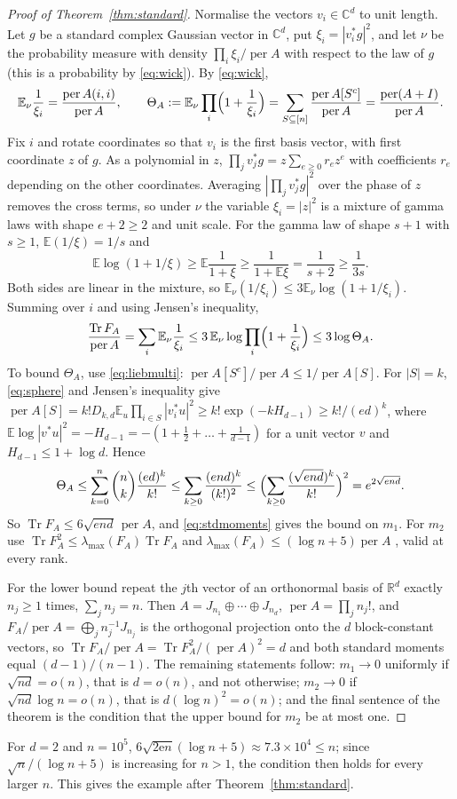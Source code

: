 \documentclass[11pt,a4paper]{article}
\theoremstyle{remark}
\newcommand{\per}{\operatorname{per}}
\newcommand{\Tr}{\operatorname{Tr}}
\newcommand{\R}{\mathbb R}
\newcommand{\C}{\mathbb C}
\newcommand{\E}{\mathbb E}
\begin{document}
\begin{proof}[Proof of Theorem~\ref{thm:standard}]
Normalise the vectors $v_i\in\C^d$ to unit length. Let $g$ be a standard complex Gaussian vector in $\C^d$, put $\xi_i=|v_i^*g|^2$, and let $\nu$ be the probability measure with density $\prod_i\xi_i/\per A$ with respect to the law of $g$ (this is a probability by \eqref{eq:wick}). By \eqref{eq:wick},
\[
 \E_\nu\frac1{\xi_i}=\frac{\per A(i,i)}{\per A},\qquad
 \Theta_A:=\E_\nu\prod_i\Bigl(1+\frac1{\xi_i}\Bigr)=\sum_{S\subseteq[n]}\frac{\per A[S^c]}{\per A}=\frac{\per(A+I)}{\per A}.
\]
Fix $i$ and rotate coordinates so that $v_i$ is the first basis vector, with first coordinate $z$ of $g$. As a polynomial in $z$, $\prod_jv_j^*g=z\sum_{e\ge0}r_ez^e$ with coefficients $r_e$ depending on the other coordinates. Averaging $|\prod_jv_j^*g|^2$ over the phase of $z$ removes the cross terms, so under $\nu$ the variable $\xi_i=|z|^2$ is a mixture of gamma laws with shape $e+2\ge2$ and unit scale. For the gamma law of shape $s+1$ with $s\ge1$, $\E(1/\xi)=1/s$ and
\[
 \E\log(1+1/\xi)\ge\E\frac1{1+\xi}\ge\frac1{1+\E\xi}=\frac1{s+2}\ge\frac1{3s}.
\]
Both sides are linear in the mixture, so $\E_\nu(1/\xi_i)\le3\E_\nu\log(1+1/\xi_i)$. Summing over $i$ and using Jensen's inequality,
\[
 \frac{\Tr F_A}{\per A}=\sum_i\E_\nu\frac1{\xi_i}\le3\,\E_\nu\log\prod_i\Bigl(1+\frac1{\xi_i}\Bigr)\le3\log\Theta_A .
\]
To bound $\Theta_A$, use \eqref{eq:liebmulti}: $\per A[S^c]/\per A\le1/\per A[S]$. For $|S|=k$, \eqref{eq:sphere} and Jensen's inequality give $\per A[S]=k!D_{k,d}\E_u\prod_{i\in S}|v_i^*u|^2\ge k!\exp(-kH_{d-1})\ge k!/(ed)^k$, where $\E\log|v^*u|^2=-H_{d-1}=-(1+\frac12+\dots+\frac1{d-1})$ for a unit vector $v$ and $H_{d-1}\le1+\log d$. Hence
\[
 \Theta_A\le\sum_{k=0}^n\binom nk\frac{(ed)^k}{k!}\le\sum_{k\ge0}\frac{(end)^k}{(k!)^2}\le\Bigl(\sum_{k\ge0}\frac{(\sqrt{end})^k}{k!}\Bigr)^2=e^{2\sqrt{end}} .
\]
So $\Tr F_A\le6\sqrt{end}\,\per A$, and \eqref{eq:stdmoments} gives the bound on $m_1$. For $m_2$ use $\Tr F_A^2\le\lambda_{\max}(F_A)\Tr F_A$ and $\lambda_{\max}(F_A)\le(\log n+5)\per A$ \cite[Proposition~2.4]{EPBS}, valid at every rank.

For the lower bound repeat the $j$th vector of an orthonormal basis of $\R^d$ exactly $n_j\ge1$ times, $\sum_jn_j=n$. Then $A=J_{n_1}\oplus\cdots\oplus J_{n_d}$, $\per A=\prod_jn_j!$, and $F_A/\per A=\bigoplus_jn_j^{-1}J_{n_j}$ is the orthogonal projection onto the $d$ block-constant vectors, so $\Tr F_A/\per A=\Tr F_A^2/(\per A)^2=d$ and both standard moments equal $(d-1)/(n-1)$. The remaining statements follow: $m_1\to0$ uniformly if $\sqrt{nd}=o(n)$, that is $d=o(n)$, and not otherwise; $m_2\to0$ if $\sqrt{nd}\log n=o(n)$, that is $d(\log n)^2=o(n)$; and the final sentence of the theorem is the condition that the upper bound for $m_2$ be at most one.
\end{proof}
For $d=2$ and $n=10^5$, $6\sqrt{2\mathrm en}(\log n+5)\approx7.3\times10^4\le n$; since $\sqrt n/(\log n+5)$ is increasing for $n>1$, the condition then holds for every larger $n$. This gives the example after Theorem~\ref{thm:standard}.
\end{document}
